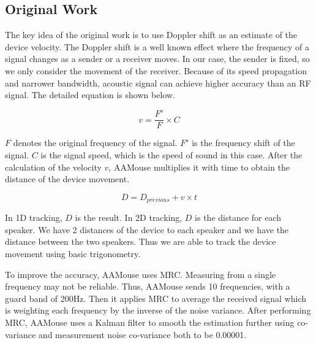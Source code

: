 \documentclass{acm_proc_article-sp}
\begin{document}
\subsection{Original Work}
The key idea of the original work is to use Doppler shift as an
estimate of the device velocity. The Doppler shift is a well known
effect where the frequency of a signal changes as a sender or a 
receiver moves. In our case, the sender is fixed, so we only 
consider the movement of the receiver. Because of its speed propagation and narrower bandwidth, 
acoustic signal can achieve higher accuracy than an RF signal.
The detailed equation is shown below.

\begin{equation}
v= \frac {F^s}{F} \times C
\end{equation}

\begin{math} F \end{math} denotes the original frequency of the
signal. \begin{math} F^s \end{math} is the frequency shift of the
signal. \begin{math} C \end{math} is the signal speed, which is the speed of sound in this case. After the calculation of the velocity
\begin{math} v \end{math}, AAMouse multiplies it 
with time to obtain the distance of the device movement.

\begin{equation}
D = D_{previous} + v \times t
\end{equation}

In 1D tracking, \begin{math} D \end{math} is the result. In 2D
tracking, \begin{math} D \end{math} is the distance for each
speaker. We have 2 distances of the device to each speaker and
we have the distance between the two speakers. Thus we are able to
track the device movement using basic trigonometry. 

To improve the accuracy, AAMouse uses MRC. 
Measuring from a single frequency may not be reliable. Thus, AAMouse
sends 10 frequencies, with a guard band of 
200Hz. Then it applies MRC to average the received signal which is weighting each frequency
by the inverse of the noise variance. After performing MRC,
AAMouse uses a Kalman filter to smooth the estimation further using
co-variance and measurement noise co-variance both to be 0.00001.
\end{document}
